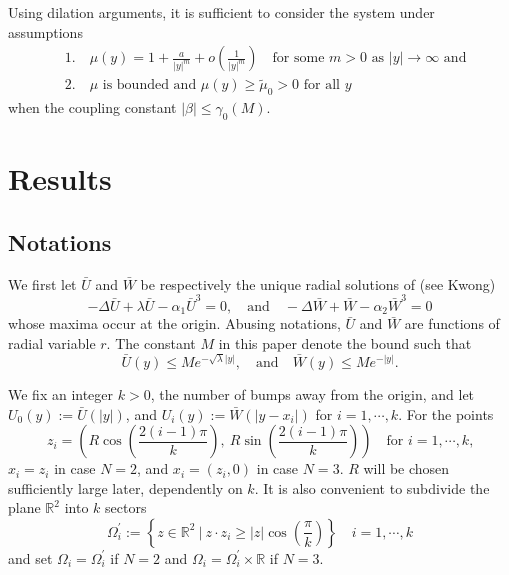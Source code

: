 \documentclass[a4paper,11pt]{article}
\numberwithin{step}{dummy}
\begin{document}
Using dilation arguments, it is sufficient to consider the system under assumptions
\begin{equation}\tag{$A_1$}\label{A1}
 \begin{aligned}
  &1. \quad \mu(y) = 1 + \frac{a}{|y|^m} + o\left(\frac{1}{|y|^m}\right) \quad \text{for some $m>0$ as $|y| \rightarrow \infty$ and}\\
  &2. \quad \text{$\mu$ is bounded and $\mu(y)\ge \tilde{\mu}_0 > 0$ for all $y$}
 \end{aligned}
\end{equation}
when the coupling constant $|\beta| \le \gamma_0(M)$.

\section{Results}




\subsection{Notations}
We first let $\bar{U}$ and $\bar{W}$ be respectively the unique radial solutions  of (see Kwong)
\begin{equation*}
 -\Delta \bar{U} + \lambda \bar{U} - \alpha_1 \bar{U}^3 = 0, \quad \text{and} \quad -\Delta \bar{W} + \bar{W} - \alpha_2 \bar{W}^3 = 0
\end{equation*}
whose maxima occur at the origin. Abusing notations, $\bar{U}$ and $\bar{W}$ are functions of radial variable $r$. The constant $M$ in this paper denote the bound such that
$$\bar{U}(y) \le Me^{-\sqrt{\lambda}|y|}, \quad \text{and} \quad \bar{W}(y) \le Me^{-|y|}.$$


We fix an integer $k>0$, the number of bumps away from the origin, and let $U_0(y):=\bar{U}(|y|)$, and $U_i(y):=\bar{W}(|y-x_i|)$ for $i=1,\cdots,k$. For the points 
$$z_i= \left( R \cos\left(\frac{2(i-1)\pi}{k}\right), ~R \sin\left(\frac{2(i-1)\pi}{k}\right)\right) \quad \text{for $i=1,\cdots,k$,}$$
$x_i = z_i$ in case $N=2$, and $x_i = (z_i,0)$ in case $N=3$. $R$ will be chosen sufficiently large later, dependently on $k$. It is also convenient to subdivide the plane $\mathbb{R}^2$ into $k$ sectors
$$\Omega^\prime_i := \left\{z \in \mathbb{R}^2~\Big|~ z\cdot z_i \ge |z|\cos\left(\frac{\pi}{k}\right)\right\} \quad i=1,\cdots,k$$
and set $\Omega_i = \Omega^\prime_i$ if $N=2$ and $\Omega_i = \Omega^\prime_i \times \mathbb{R}$ if $N=3$.
\end{document}
